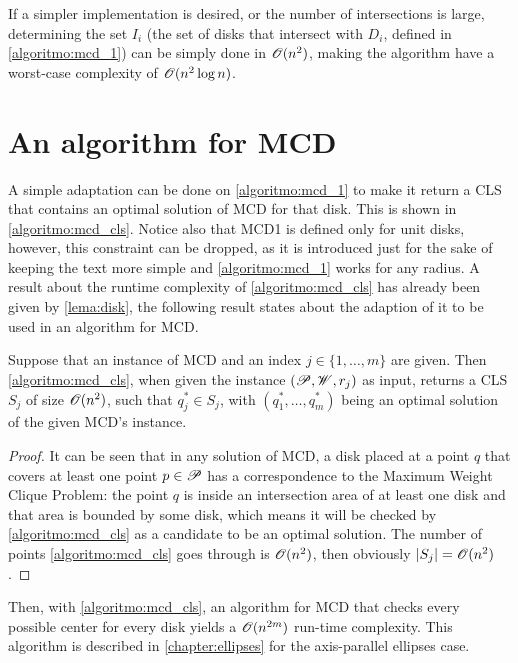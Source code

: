 If a simpler implementation is desired, or the number of intersections is large, determining the set $I_i$ (the set of disks that intersect with $D_i$, defined in \autoref{algoritmo:mcd_1}) can be simply done in $\mathscr{O}(n^2)$, making the algorithm have a worst-case complexity of $\mathscr{O}(n^2\log{n})$.


\section{An algorithm for MCD}

A simple adaptation can be done on \autoref{algoritmo:mcd_1} to make it return a CLS that contains an optimal solution of MCD for that disk. This is shown in \autoref{algoritmo:mcd_cls}. 
Notice also that MCD1 is defined only for unit disks, however, this constraint can be dropped, as it is introduced just for the sake of keeping the text more simple and \autoref{algoritmo:mcd_1} works for any radius. A result about the runtime complexity of \autoref{algoritmo:mcd_cls} has already been given by \autoref{lema:disk}, the following result states about the adaption of it to be used in an algorithm for MCD.

\begin{lema}\label{lema:mcd}
	Suppose that an instance of MCD and an index $j\in\{1, \dots, m\}$ are given.
	Then \autoref{algoritmo:mcd_cls}, when given the instance $(\mathscr{P}, \mathscr{W}, r_j)$ as input, returns a CLS $S_j$ of size $\mathscr{O}(n^2)$, such that $q^*_j\in S_j$, with $(q^*_1, \dots, q^*_m)$ being an optimal solution of the given MCD's instance.
\end{lema}

\begin{proof}
It can be seen that in any solution of MCD, a disk placed at a point $q$ that covers at least one point $p \in \mathscr{P}$ has a correspondence to the Maximum Weight Clique Problem: the point $q$ is inside an intersection area of at least one disk and that area is bounded by some disk, which means it will be checked by \autoref{algoritmo:mcd_cls} as a candidate to be an optimal solution. The number of points \autoref{algoritmo:mcd_cls} goes through is $\mathscr{O}(n^2)$, then
obviously $|S_j|=\mathscr{O}(n^2)$.
\end{proof}

Then, with \autoref{algoritmo:mcd_cls}, an algorithm for MCD that checks every possible center for every disk yields a $\mathscr{O}(n^{2m})$ run-time complexity.
This algorithm is described in \autoref{chapter:ellipses} for the axis-parallel ellipses case.

